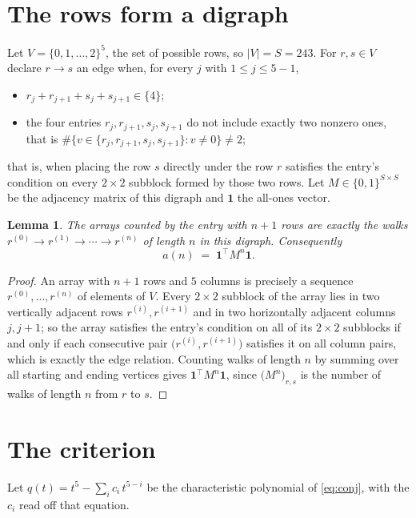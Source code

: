 \documentclass[11pt,a4paper]{article}
\theoremstyle{plain}
\newtheorem{lemma}[theorem]{Lemma}
\theoremstyle{definition}
\begin{document}
\section{The rows form a digraph}

Let $V=\{0,1,\dots,2\}^{5}$, the set of possible rows, so $|V|=S=243$. For
$r,s\in V$ declare $r\to s$ an edge when, for every $j$ with $1\le j\le 5-1$,
\begin{itemize}
\item $r_j+r_{j+1}+s_j+s_{j+1}\in\{4\}$;
\item the four entries $r_j,r_{j+1},s_j,s_{j+1}$ do not include exactly two nonzero ones, that is $\#\bigl\{v\in\{r_j,r_{j+1},s_j,s_{j+1}\}: v\ne0\bigr\}\ne2$;
\end{itemize}
that is, when placing the row $s$ directly under the row $r$ satisfies the entry's
condition on every $2\times2$ subblock formed by those two rows. Let $M\in\{0,1\}^{S\times
S}$ be the adjacency matrix of this digraph and $\mathbf{1}$ the all-ones vector.

\begin{lemma}\label{lem:walk}
The arrays counted by the entry with $n+1$ rows are exactly the walks
$r^{(0)}\to r^{(1)}\to\cdots\to r^{(n)}$ of length $n$ in this digraph. Consequently
\[
a(n)\;=\;\mathbf{1}^{\!\top}M^{n}\mathbf{1} .
\]
\end{lemma}

\begin{proof}
An array with $n+1$ rows and $5$ columns is precisely a sequence
$r^{(0)},\dots,r^{(n)}$ of elements of $V$. Every $2\times2$ subblock of the array lies
in two vertically adjacent rows $r^{(i)},r^{(i+1)}$ and in two horizontally adjacent
columns $j,j+1$; so the array satisfies the entry's condition on all of its $2\times2$
subblocks if and only if each consecutive pair $\bigl(r^{(i)},r^{(i+1)}\bigr)$ satisfies
it on all column pairs, which is exactly the edge relation. Counting walks of length $n$ by
summing over all starting and ending vertices gives
$\mathbf{1}^{\!\top}M^{n}\mathbf{1}$, since
$\bigl(M^{n}\bigr)_{r,s}$ is the number of walks of length $n$ from $r$ to $s$.
\end{proof}

\section{The criterion}

Let $q(t)=t^{5}-\sum_{i}c_i\,t^{5-i}$ be the characteristic polynomial of
\eqref{eq:conj}, with the $c_i$ read off that equation.
\end{document}
